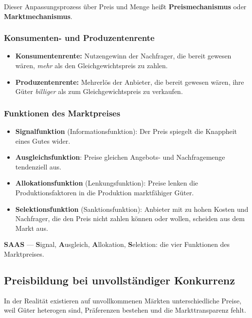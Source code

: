 \documentclass[11pt, a4paper]{article}
\begin{document}
Dieser Anpassungsprozess über Preis und Menge heißt \textbf{Preismechanismus} oder
\textbf{Marktmechanismus}.

\subsubsection{Konsumenten- und Produzentenrente}

\begin{itemize}
  \item \textbf{Konsumentenrente:} Nutzengewinn der Nachfrager, die bereit gewesen wären,
    \emph{mehr} als den Gleichgewichtspreis zu zahlen.
  \item \textbf{Produzentenrente:} Mehrerlös der Anbieter, die bereit gewesen wären, ihre
    Güter \emph{billiger} als zum Gleichgewichtspreis zu verkaufen.
\end{itemize}

\subsubsection{Funktionen des Marktpreises}

\begin{itemize}
  \item \textbf{Signalfunktion} (Informationsfunktion): Der Preis spiegelt die Knappheit
    eines Gutes wider.
  \item \textbf{Ausgleichsfunktion}: Preise gleichen Angebots- und Nachfragemenge
    tendenziell aus.
  \item \textbf{Allokationsfunktion} (Lenkungsfunktion): Preise lenken die
    Produktionsfaktoren in die Produktion marktfähiger Güter.
  \item \textbf{Selektionsfunktion} (Sanktionsfunktion): Anbieter mit zu hohen Kosten und
    Nachfrager, die den Preis nicht zahlen können oder wollen, scheiden aus dem Markt aus.
\end{itemize}

\begin{eselsbruecke}
\textbf{SAAS} --- \textbf{S}ignal, \textbf{A}usgleich, \textbf{A}llokation,
\textbf{S}elektion: die vier Funktionen des Marktpreises.
\end{eselsbruecke}

\subsection{Preisbildung bei unvollständiger Konkurrenz}

In der Realität existieren auf unvollkommenen Märkten unterschiedliche Preise, weil Güter
heterogen sind, Präferenzen bestehen und die Markttransparenz fehlt.
\end{document}

